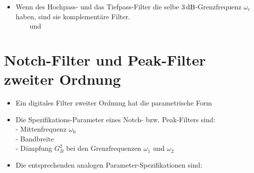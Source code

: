 	\begin{itemize}
	 \item Wenn des Hochpass- und das Tiefpass-Filter die selbe $3\,\text{dB}$-Grenzfrequenz $\omega_c$ haben, sind sie komplementäre Filter.\\[0.2cm]
	 $\qquad$und$\qquad$
	\end{itemize}
\newpage
\section{Notch-Filter und Peak-Filter zweiter Ordnung}
	\vspace*{-0.2cm}\begin{itemize}
		\item Ein digitales Filter zweiter Ordnung hat die parametrische Form$\qquad$\\[-0.45cm]
		\item Die Spezifikations-Parameter eines Notch- bzw. Peak-Filters sind:\\[0.1cm]
		- Mittenfrequenz $\omega_0$\\[0.15cm]
		- Bandbreite \\[-0.1cm]
		- Dämpfung $G_B^2$ bei den Grenzfrequenzen $\omega_1$ und $\omega_2\quad$\\[-0.45cm]
		\item Die entsprechenden analogen Parameter-Spezifikationen sind:\\[0.15cm]
		$\qquad$
		$\qquad$
	\end{itemize}
